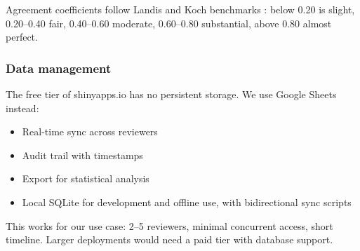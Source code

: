 Agreement coefficients follow Landis and Koch benchmarks \cite{landis1977}: below 0.20 is slight, 0.20--0.40 fair, 0.40--0.60 moderate, 0.60--0.80 substantial, above 0.80 almost perfect.

\subsubsection{Data management}
The free tier of shinyapps.io has no persistent storage. We use Google Sheets instead:
\begin{itemize}
    \item Real-time sync across reviewers
    \item Audit trail with timestamps
    \item Export for statistical analysis
    \item Local SQLite for development and offline use, with bidirectional sync scripts
\end{itemize}

This works for our use case: 2--5 reviewers, minimal concurrent access, short timeline. Larger deployments would need a paid tier with database support.
